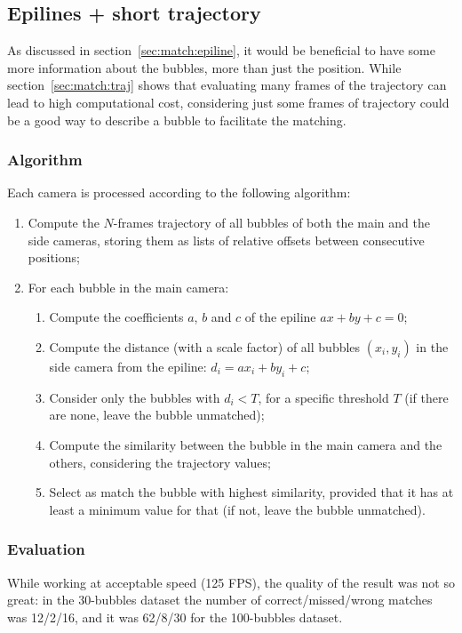\subsection{Epilines + short trajectory}
\label{sec:match:epi-traj}

As discussed in section~\ref{sec:match:epiline}, it would be beneficial to have some more information about the bubbles, more than just the position.
While section~\ref{sec:match:traj} shows that evaluating many frames of the trajectory can lead to high computational cost, considering just some frames of trajectory could be a good way to describe a bubble to facilitate the matching.

\subsubsection{Algorithm}

Each camera is processed according to the following algorithm:
\begin{enumerate}
	\itemsep 0em
	\item Compute the $N$-frames trajectory of all bubbles of both the main and the side cameras, storing them as lists of relative offsets between consecutive positions;
	\item For each bubble in the main camera:
	      \begin{enumerate}
		      \item Compute the coefficients $a$, $b$ and $c$ of the epiline $ax+by+c{=}0$;
		      \item Compute the distance (with a scale factor) of all bubbles $(x_i, y_i)$ in the side camera from the epiline: $d_i = ax_i + by_i + c$;
		      \item Consider only the bubbles with $d_i<T$, for a specific threshold $T$ (if there are none, leave the bubble unmatched);
		      \item Compute the similarity between the bubble in the main camera and the others, considering the trajectory values;
		      \item Select as match the bubble with highest similarity, provided that it has at least a minimum value for that (if not, leave the bubble unmatched).
	      \end{enumerate}
\end{enumerate}

\subsubsection{Evaluation}

While working at acceptable speed (125 FPS), the quality of the result was not so great: in the 30-bubbles dataset the number of correct/missed/wrong matches was 12/2/16, and it was 62/8/30 for the 100-bubbles dataset.
